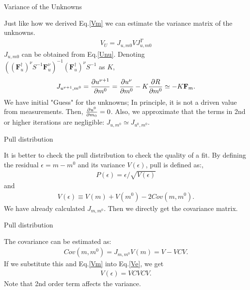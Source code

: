 \documentclass[
	xcolor=dvipsnames,
	10pt, 
	]{beamer}
\begin{document}
\begin{frame}{Variance of the Unknowns}
	\begin{block}{}
			Just like how we derived  Eq.\eqref{Vm} we can estimate the variance matrix of the unknowns. 
		\begin{align}
			V_U = J_{u,m0} V J_{u,m0}^T
		\end{align}
		$J_{u,m0}$ can be obtained from Eq.\eqref{Unu}. Denoting\\ $((\mathbf{F}_u^\dagger)^\nu S^{-1}\mathbf F^\nu_u)^{-1}(\mathbf{F}_u^\dagger)^\nu S^{-1}$ as $K$, 
		\begin{align}
			J_{u^{\nu+1},m^0} = \frac{\partial u^{\nu+1}}{\partial m^0} = \frac{\partial u^{\nu}}{\partial m^0} - K\frac{\partial R}{\partial m^0} \simeq -K \mathbf{F}_m.
		\end{align}
		We have initial "Guess" for the unknowns; In principle, it is not a driven value from measurements. Then, $\frac{\partial u^0}{\partial m_0} = 0$. Also, we approximate that the terms in 2nd or higher iterations are negligible: $J_{u,m^0}\simeq J_{u^0,m^0}$.
	\end{block}
\end{frame}
\begin{frame}{Pull distribution}
	\begin{block}{}
		It is better to check the pull distribution to check the quality of a fit. By defining the residual $\epsilon = m-m^0$ and its variance $V(\epsilon)$, pull is defined as:, 
		\begin{align}
			P(\epsilon) = \epsilon/\sqrt{V(\epsilon)}
		\end{align}
		and
		\begin{align}
			V(\epsilon) \equiv V(m)+ V(m^0) - 2 Cov(m,m^0).\label{Ve}
		\end{align}
		We have already calculated $J_{m,m^0}$. Then we directly get the covariance matrix. 
	\end{block}
\end{frame} 
\begin{frame}{Pull distribution}
	\begin{block}{}
		The covariance can be estimated as:
		\begin{align}
			Cov(m,m^0) = J_{m,m^0}V(m) = V - VCV.
		\end{align}
		If we substitute this and Eq.\eqref{Vm} into Eq.\eqref{Ve}, we get
		\begin{align}
			V(\epsilon) = VCVCV.
		\end{align}
		Note that 2nd order term affects the variance.	
	\end{block}
\end{frame}
\end{document}
